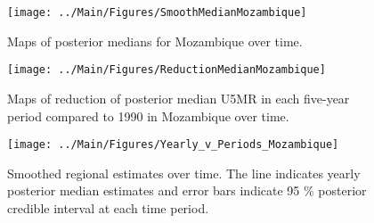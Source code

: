 \documentclass[12pt]{article}\usepackage[]{graphicx}\usepackage[]{color}
\newenvironment{knitrout}{}{} %
\begin{document}
\begin{knitrout}
\color{fgcolor}\begin{figure}[bht]

{\centering \texttt{[image: ../Main/Figures/SmoothMedianMozambique]} 

}

\caption[Maps of posterior medians for Mozambique  over time]{Maps of posterior medians for Mozambique  over time.}\label{fig:unnamed-chunk-234}
\end{figure}


\end{knitrout}
\begin{knitrout}
\color{fgcolor}\begin{figure}[bht]

{\centering \texttt{[image: ../Main/Figures/ReductionMedianMozambique]} 

}

\caption[Maps of reduction of posterior median U5MR in each five-year period compared to 1990 in Mozambique over time]{Maps of reduction of posterior median U5MR in each five-year period compared to 1990 in Mozambique over time.}\label{fig:unnamed-chunk-235}
\end{figure}


\end{knitrout}
\begin{knitrout}
\color{fgcolor}\begin{figure}[bht]

{\centering \texttt{[image: ../Main/Figures/Yearly\_v\_Periods\_Mozambique]} 

}

\caption[Smoothed regional estimates over time]{Smoothed regional estimates over time. The line indicates yearly posterior median estimates and error bars indicate 95 \% posterior credible interval at each time period.}\label{fig:unnamed-chunk-236}
\end{figure}


\end{knitrout}
\end{document}
